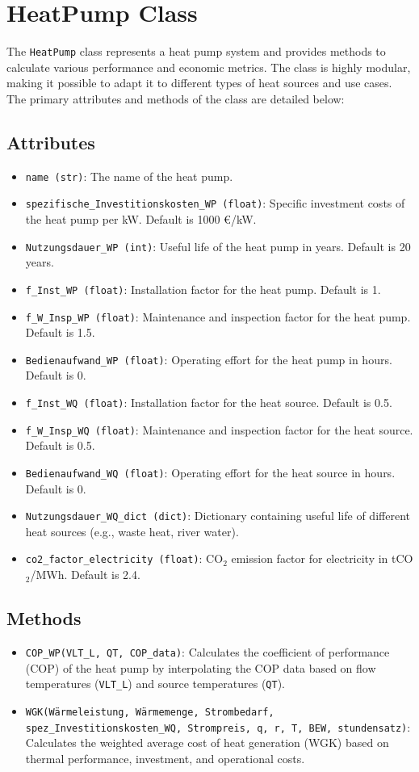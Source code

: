 \section{HeatPump Class}
The \texttt{HeatPump} class represents a heat pump system and provides methods to calculate various performance and economic metrics. The class is highly modular, making it possible to adapt it to different types of heat sources and use cases. The primary attributes and methods of the class are detailed below:

\subsection{Attributes}
\begin{itemize}
    \item \texttt{name (str)}: The name of the heat pump.
    \item \texttt{spezifische\_Investitionskosten\_WP (float)}: Specific investment costs of the heat pump per kW. Default is 1000 €/kW.
    \item \texttt{Nutzungsdauer\_WP (int)}: Useful life of the heat pump in years. Default is 20 years.
    \item \texttt{f\_Inst\_WP (float)}: Installation factor for the heat pump. Default is 1.
    \item \texttt{f\_W\_Insp\_WP (float)}: Maintenance and inspection factor for the heat pump. Default is 1.5.
    \item \texttt{Bedienaufwand\_WP (float)}: Operating effort for the heat pump in hours. Default is 0.
    \item \texttt{f\_Inst\_WQ (float)}: Installation factor for the heat source. Default is 0.5.
    \item \texttt{f\_W\_Insp\_WQ (float)}: Maintenance and inspection factor for the heat source. Default is 0.5.
    \item \texttt{Bedienaufwand\_WQ (float)}: Operating effort for the heat source in hours. Default is 0.
    \item \texttt{Nutzungsdauer\_WQ\_dict (dict)}: Dictionary containing useful life of different heat sources (e.g., waste heat, river water).
    \item \texttt{co2\_factor\_electricity (float)}: CO$_2$ emission factor for electricity in tCO$_2$/MWh. Default is 2.4.
\end{itemize}

\subsection{Methods}
\begin{itemize}
    \item \texttt{COP\_WP(VLT\_L, QT, COP\_data)}: Calculates the coefficient of performance (COP) of the heat pump by interpolating the COP data based on flow temperatures (\texttt{VLT\_L}) and source temperatures (\texttt{QT}).
    \item \texttt{WGK(Wärmeleistung, Wärmemenge, Strombedarf, spez\_Investitionskosten\_WQ, Strompreis, q, r, T, BEW, stundensatz)}: Calculates the weighted average cost of heat generation (WGK) based on thermal performance, investment, and operational costs.
\end{itemize}